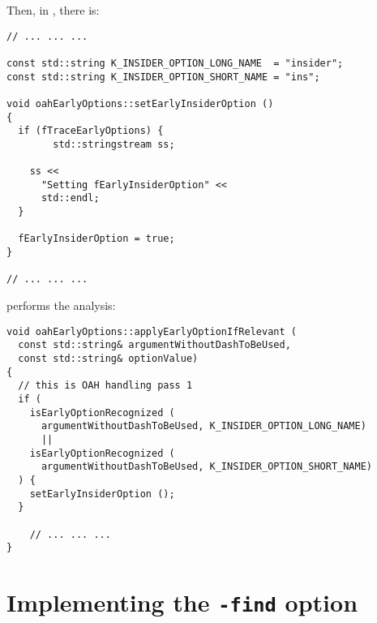 Then, in , there is:
\begin{lstlisting}[language=Terminal]
// ... ... ...

const std::string K_INSIDER_OPTION_LONG_NAME  = "insider";
const std::string K_INSIDER_OPTION_SHORT_NAME = "ins";

void oahEarlyOptions::setEarlyInsiderOption ()
{
  if (fTraceEarlyOptions) {
		std::stringstream ss;

    ss <<
      "Setting fEarlyInsiderOption" <<
      std::endl;
  }

  fEarlyInsiderOption = true;
}

// ... ... ...
\end{lstlisting}

 performs the analysis:
\begin{lstlisting}[language=CPlusPlus]
void oahEarlyOptions::applyEarlyOptionIfRelevant (
  const std::string& argumentWithoutDashToBeUsed,
  const std::string& optionValue)
{
  // this is OAH handling pass 1
  if (
    isEarlyOptionRecognized (
      argumentWithoutDashToBeUsed, K_INSIDER_OPTION_LONG_NAME)
      ||
    isEarlyOptionRecognized (
      argumentWithoutDashToBeUsed, K_INSIDER_OPTION_SHORT_NAME)
  ) {
    setEarlyInsiderOption ();
  }

	// ... ... ...
}
\end{lstlisting}


\section{Implementing the {\tt -find} option}

